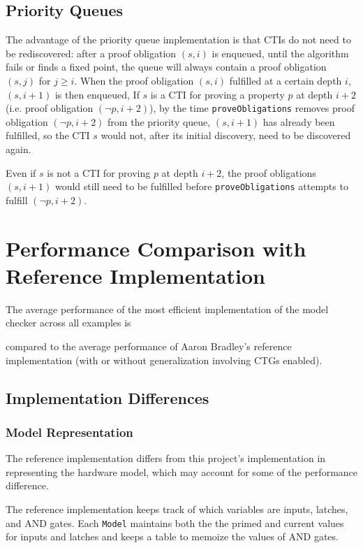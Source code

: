 \documentclass[12pt,a4paper,twoside,openright]{report}
\begin{document}
{\subsection{Priority Queues}

The advantage of the priority queue implementation is that CTIs do not need
to be rediscovered: after a proof obligation $(s,i)$ is enqueued, until the algorithm fails or finds a fixed point,
the queue will always contain a proof obligation $(s,j)$ for $j \geq i$. When the proof obligation $(s,i)$
fulfilled at a certain depth $i$, $(s,i + 1)$ is then enqueued, If $s$ is a CTI for proving a property
$p$ at depth $i + 2$ (i.e. proof obligation $(\neg p, i + 2)$), by the time \verb,proveObligations, removes
proof obligation $(\neg p, i + 2)$ from the priority queue, $(s, i+1)$ has already been fulfilled, so the
CTI $s$ would not, after its initial discovery, need to be discovered again.

Even if $s$ is not a CTI for proving $p$ at depth $i + 2$, the proof obligations $(s, i+1)$ would still need to
be fulfilled before \verb,proveObligations, attempts to fulfill $(\neg p, i + 2)$.

\section{Performance Comparison with Reference Implementation}

The average performance of the most efficient implementation of the model checker across all examples is

compared to the average performance of Aaron Bradley's reference implementation (with or without generalization
involving CTGs enabled).

\subsection{Implementation Differences}

\subsubsection{Model Representation}
The reference implementation differs from this project's implementation in representing the hardware model,
which may account for some of the performance difference.

The reference implementation keeps track of which variables are inputs, latches, and AND gates.
Each \verb,Model, maintains both the the primed and current values for inputs and latches and keeps a
table to memoize the values of AND gates.

}
\end{document}

